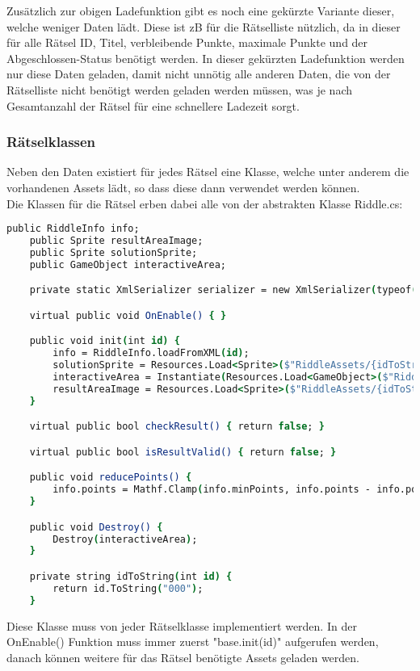 Zusätzlich zur obigen Ladefunktion gibt es noch eine gekürzte Variante dieser, welche weniger Daten lädt. Diese ist zB für die Rätselliste nützlich, da in dieser für alle Rätsel ID, Titel, verbleibende Punkte, maximale Punkte und der Abgeschlossen-Status benötigt werden. In dieser gekürzten Ladefunktion werden nur diese Daten geladen, damit nicht unnötig alle anderen Daten, die von der Rätselliste nicht benötigt werden geladen werden müssen, was je nach Gesamtanzahl der Rätsel für eine schnellere Ladezeit sorgt.

\subsubsection{Rätselklassen}
Neben den Daten existiert für jedes Rätsel eine Klasse, welche unter anderem die vorhandenen Assets lädt, so dass diese dann verwendet werden können.\\
Die Klassen für die Rätsel erben dabei alle von der abstrakten Klasse Riddle.cs:
\begin{lstlisting}[language=csh, caption={Riddle.cs base Klasse}]
	public RiddleInfo info;
    public Sprite resultAreaImage;
    public Sprite solutionSprite;
    public GameObject interactiveArea;

    private static XmlSerializer serializer = new XmlSerializer(typeof(RiddleInfo));

    virtual public void OnEnable() { }

    public void init(int id) {
        info = RiddleInfo.loadFromXML(id);
        solutionSprite = Resources.Load<Sprite>($"RiddleAssets/{idToString(id)}/solution") as Sprite;
        interactiveArea = Instantiate(Resources.Load<GameObject>($"RiddleAssets/{idToString(id)}/R{idToString(id)}")) as GameObject;
        resultAreaImage = Resources.Load<Sprite>($"RiddleAssets/{idToString(id)}/result") as Sprite;
    }

    virtual public bool checkResult() { return false; }

    virtual public bool isResultValid() { return false; }

    public void reducePoints() {
        info.points = Mathf.Clamp(info.minPoints, info.points - info.pointReduction, info.maxPoints);
    }

    public void Destroy() {
        Destroy(interactiveArea);
    }

    private string idToString(int id) {
        return id.ToString("000");
    }
\end{lstlisting}
Diese Klasse muss von jeder Rätselklasse implementiert werden. In der OnEnable() Funktion muss immer zuerst "base.init(id)" aufgerufen werden, danach können weitere für das Rätsel benötigte Assets geladen werden.\\
